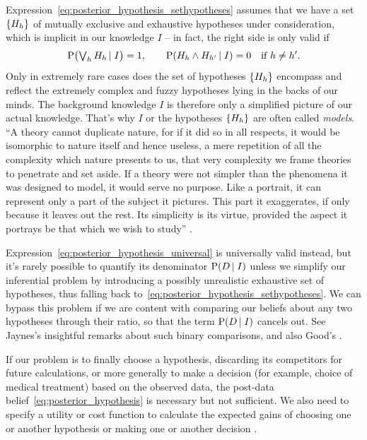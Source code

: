 \documentclass[\ifafour a4paper,12pt,\else a5paper,10pt,\fi%
onecolumn,oneside,article,%
british%
]{memoir}
\theoremstyle{remark}
\theoremstyle{innote}
\newcommand*{\citep}{\parencites}
\newcommand*{\citey}{\parencites*}
\DeclarePairedDelimiter\set{\{}{\}}
\newcommand*{\p}{\mathrm{P}}%
\renewcommand*{\|}[1][]{\nonscript\,#1\vert\nonscript\;\mathopen{}}
\newcommand*{\sect}{\S}%
\newcommand*{\sects}{\S\S}%
\newcommand*{\chap}{ch.}%
\newcommand*{\tlor}{\mathop{\textstyle\bigvee}\nolimits}
\newcommand*{\yK}{I}
\begin{document}
Expression~\eqref{eq:posterior_hypothesis_sethypotheses} assumes that
we have a set $\set{H_{h}}$ of mutually exclusive and exhaustive hypotheses
under consideration, which is implicit in our knowledge $\yK$ -- in fact,
the right side is only valid if
\begin{equation}
  \label{eq:implicit_knowledge}
  \p\bigl(\tlor_{h} H_{h} \| \yK\bigr) = 1,
  \qquad
  \p(H_{h} \land H_{h'} \| \yK) = 0 \quad \text{if $h \ne h'$}.
\end{equation}
Only in extremely rare cases does the set of hypotheses $\set{H_{h}}$
encompass and reflect the extremely complex and fuzzy hypotheses lying
in the backs of our minds. The background knowledge $\yK$ is therefore only
a simplified picture of our actual knowledge. That's why $\yK$ or the
hypotheses $\set{H_{h}}$ are often called \emph{models}.\; \enquote{A
  theory cannot duplicate nature, for if it did so in all respects, it
  would be isomorphic to nature itself and hence useless, a mere repetition
  of all the complexity which nature presents to us, that very complexity
  we frame theories to penetrate and set aside. If a theory were not
  simpler than the phenomena it was designed to model, it would serve no
  purpose. Like a portrait, it can represent only a part of the subject it
  pictures. This part it exaggerates, if only because it leaves out the
  rest. Its simplicity is its virtue, provided the aspect it portrays be
  that which we wish to study} \citep[Prologue p.~xvi]{truesdelletal1980}.

Expression~\eqref{eq:posterior_hypothesis_universal} is universally valid
instead, but it's rarely possible to quantify its denominator
$\p(D \| \yK)$ unless we simplify our inferential problem by introducing a
possibly unrealistic exhaustive set of hypotheses, thus falling back
to~\eqref{eq:posterior_hypothesis_sethypotheses}. We can bypass this
problem if we are content with comparing our beliefs about any two
hypotheses through their ratio, so that the term $\p(D \| \yK)$ cancels
out. See Jaynes's \citey[\sects~4.3--4.4]{jaynes1994_r2003} insightful
remarks about such binary comparisons, and also Good's
\citey[\sect~6.3--6.6]{good1950}.


\bigskip

If our problem is to finally choose a hypothesis, discarding its
competitors for future calculations, or more generally to make a decision
(for example, choice of medical treatment) based on the observed data, the
post-data belief~\eqref{eq:posterior_hypothesis} is necessary but not
sufficient. We also need to specify a utility or cost function to calculate
the expected gains of choosing one or another hypothesis or making one or
another decision
\citep{kadaneetal1980b,degroot1970_r2004}[\chap~2]{bernardoetal1994_r2000}.
\end{document}
